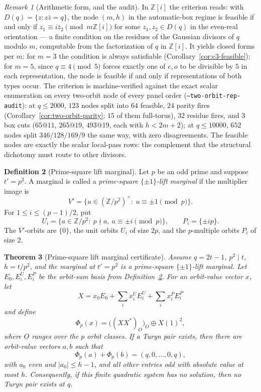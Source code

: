 \documentclass[11pt]{article}
\theoremstyle{plain}
\newtheorem{theorem}{Theorem}[section]
\theoremstyle{definition}
\newtheorem{definition}[theorem]{Definition}
\theoremstyle{remark}
\newtheorem{remark}[theorem]{Remark}
\newcommand{\Z}{\mathbb Z}
\begin{document}
\begin{remark}[Arithmetic form, and the audit]\label{rem:two-orbit-arithmetic}
In $\Z[i]$ the criterion reads: with $D(q)=\{z:z\bar z=q\}$, the node
$(m,h)$ in the automatic-box regime is feasible if and only if
$z_1\equiv i\bar z_2\pmod{m\Z[i]}$ for some $z_1,z_2\in D(q)$ in the
even-real orientation --- a finite condition on the residues of the Gaussian
divisors of $q$ modulo $m$, computable from the factorization of $q$ in
$\Z[i]$.  It yields closed forms per $m$: for $m=3$ the condition is always
satisfiable (Corollary~\ref{cor:c3-feasible}); for $m=5$, since
$q\equiv4\pmod5$ forces exactly one of $e,o$ to be divisible by $5$ in each
representation, the node is feasible if and only if representations of both
types occur.  The criterion is machine-verified against the exact scalar
enumeration on every two-orbit node of every panel order
(\texttt{--two-orbit-rep-audit}): at $q\le2000$, $123$ nodes split into
$64$ feasible, $24$ parity fires (Corollary~\ref{cor:two-orbit-parity};
$15$ of them full-torus), $32$ residue fires, and $3$ box cuts ($65@11$,
$265@19$, $493@19$, each with $h<2m+2$); at $q\le10000$, $652$ nodes split
$346$/$128$/$169$/$9$ the same way, with zero disagreements.  The feasible
nodes are exactly the scalar local-pass rows: the complement that the
structural dichotomy must route to other divisors.
\end{remark}

\begin{definition}[Prime-square lift marginal]\label{def:prime-square-lift}
Let $p$ be an odd prime and suppose $t'=p^2$. A marginal is called a
\emph{prime-square $\{\pm1\}$-lift marginal} if the multiplier image is
\[
  V'=\{u\in(\Z/p^2)^\times:\ u\equiv \pm1 \pmod p\}.
\]
For $1\le i\le(p-1)/2$, put
\[
  U_i=\{a\in\Z/p^2:\ p\nmid a,\ a\equiv\pm i\pmod p\},\qquad
  P_i=\{\pm ip\}.
\]
The $V'$-orbits are $\{0\}$, the unit orbits $U_i$ of size $2p$, and the
$p$-multiple orbits $P_i$ of size $2$.
\end{definition}

\begin{theorem}[Prime-square lift marginal certificate]\label{thm:prime-square-lift}
Assume $q=2t-1$, $p^2\mid t$, $h=t/p^2$, and the marginal at $t'=p^2$ is a
prime-square $\{\pm1\}$-lift marginal. Let $E_0,E^U_i,E^P_i$ be the orbit-sum
basis from Definition~\ref{def:prime-square-lift}. For an orbit-value vector
$x$, let
\[
  X=x_0E_0+\sum_i x^U_iE^U_i+\sum_i x^P_iE^P_i
\]
and define
\[
  \Phi_p(x)=\bigl((XX^*)_O\bigr)_O\oplus X(1)^2,
\]
where $O$ ranges over the $p$ orbit classes. If a Turyn pair exists, then
there are orbit-value vectors $a,b$ such that
\[
  \Phi_p(a)+\Phi_p(b)=(q,0,\ldots,0,q),
\]
with $a_0$ even and $|a_0|\le h-1$, and all other entries odd with absolute
value at most $h$. Consequently, if this finite quadratic system has no
solution, then no Turyn pair exists at $q$.
\end{theorem}
\end{document}
